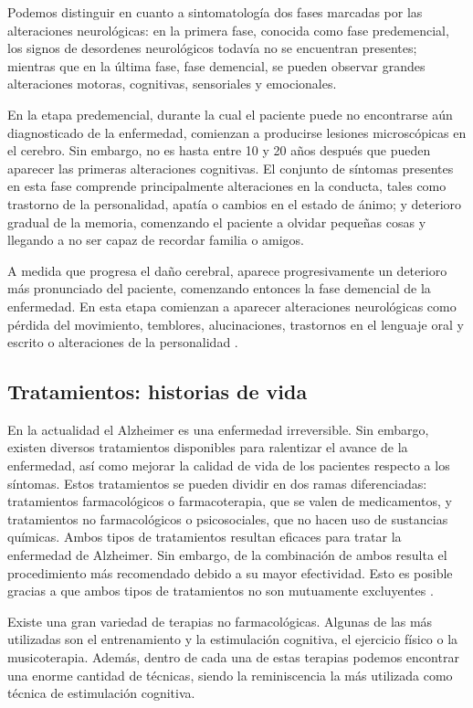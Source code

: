 Podemos distinguir en cuanto a sintomatología dos fases marcadas por las alteraciones neurológicas: en la primera fase, conocida como fase predemencial, los signos de desordenes neurológicos todavía no se encuentran presentes; mientras que en la última fase, fase demencial, se pueden observar grandes alteraciones motoras, cognitivas, sensoriales y emocionales.

En la etapa predemencial, durante la cual el paciente puede no encontrarse aún diagnosticado de la enfermedad, comienzan a producirse lesiones microscópicas en el cerebro. Sin embargo, no es hasta entre 10 y 20 años después que pueden aparecer las primeras alteraciones cognitivas. El conjunto de síntomas presentes en esta fase comprende principalmente alteraciones en la conducta, tales como trastorno de la personalidad, apatía o cambios en el estado de ánimo; y deterioro gradual de la memoria, comenzando el paciente a olvidar pequeñas cosas y llegando a no ser capaz de recordar familia o amigos.

A medida que progresa el daño cerebral, aparece progresivamente un deterioro más pronunciado del paciente, comenzando entonces la fase demencial de la enfermedad. En esta etapa comienzan a aparecer alteraciones neurológicas como pérdida del movimiento, temblores, alucinaciones, trastornos en el lenguaje oral y escrito o alteraciones de la personalidad \citep{alberca-serrano-2010}.


\subsection{Tratamientos: historias de vida}
En la actualidad el Alzheimer es una enfermedad irreversible. Sin embargo, existen diversos tratamientos disponibles para ralentizar el avance de la enfermedad, así como mejorar la calidad de vida de los pacientes respecto a los síntomas. Estos tratamientos se pueden dividir en dos ramas diferenciadas: tratamientos farmacológicos o farmacoterapia, que se valen de medicamentos, y tratamientos no farmacológicos o psicosociales, que no hacen uso de sustancias químicas. Ambos tipos de tratamientos resultan eficaces para tratar la enfermedad de Alzheimer. Sin embargo, de la combinación de ambos resulta el procedimiento más recomendado debido a su mayor efectividad. Esto es posible gracias a que ambos tipos de tratamientos no son mutuamente excluyentes \citep{romano2007enfermedad}.

Existe una gran variedad de terapias no farmacológicas. Algunas de las más utilizadas son el entrenamiento y la estimulación cognitiva, el ejercicio físico o la musicoterapia. Además, dentro de cada una de estas terapias podemos encontrar una enorme cantidad de técnicas, siendo la reminiscencia la más utilizada como técnica de estimulación cognitiva.

